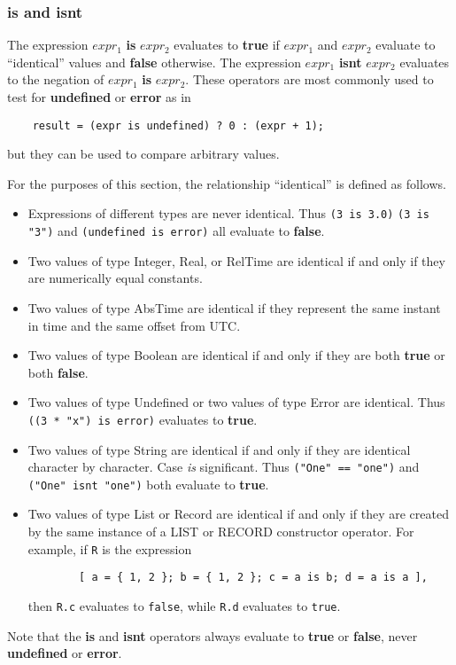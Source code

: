 \documentclass{article}
\begin{document}
\subsubsection{\textbf{is} and \textbf{isnt}}
\label{sec:is_isnt}
The expression $expr_1$ \textbf{is} $expr_2$ evaluates to \textbf{true} if
$expr_1$ and $expr_2$ evaluate to ``identical'' values and \textbf{false}
otherwise.
The expression $expr_1$ \textbf{isnt} $expr_2$ evaluates to the negation of
$expr_1$ \textbf{is} $expr_2$.
These operators are most commonly used to test for \textbf{undefined} or
\textbf{error} as in
\begin{verbatim}
    result = (expr is undefined) ? 0 : (expr + 1);
\end{verbatim}
but they can be used to compare arbitrary values.

For the purposes of this section, the relationship ``identical'' is defined as
follows.
\begin{itemize}
\item Expressions of different types are never identical.
    Thus \texttt{(3 is 3.0)} \texttt{(3 is "3")} and \texttt{(undefined is
    error)} all evaluate to \textbf{false}.
\item Two values of type Integer, Real, or RelTime are identical
    if and only if they are numerically equal constants.
\item Two values of type AbsTime are identical if they represent the same
    instant in time and the same offset from UTC.
\item Two values of type Boolean are identical if and only if they are both
    \textbf{true} or both \textbf{false}.
\item Two values of type Undefined or two values of type Error are identical.
    Thus \texttt{((3 * "x") is error)} evaluates to \textbf{true}.
\item Two values of type String are identical if and only if they are identical
    character by character.  Case \emph{is} significant.
    Thus \texttt{("One" == "one")} and \texttt{("One" isnt "one")}
    both evaluate to \textbf{true}.
\item Two values of type List or Record are identical if and only if they are
    created by the same instance of a LIST or RECORD constructor operator.
    For example, if \verb/R/ is the expression \begin{verbatim}
        [ a = { 1, 2 }; b = { 1, 2 }; c = a is b; d = a is a ],\end{verbatim}
    then \texttt{R.c} evaluates to \texttt{false}, while \texttt{R.d} evaluates
    to \texttt{true}.
\end{itemize}
Note that the \textbf{is} and \textbf{isnt} operators always evaluate to
\textbf{true} or \textbf{false}, never \textbf{undefined} or \textbf{error}.
\end{document}
